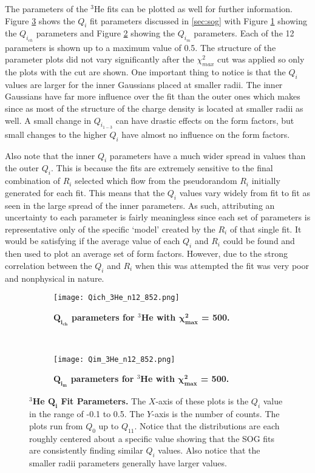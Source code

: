 The parameters of the $^3$He fits can be plotted as well for further information. Figure \ref{fig:3he_qi} shows the $Q_i$ fit parameters discussed in \ref{sec:sog} with Figure \ref{fig:3he_qch} showing the $Q_{i_{ch}}$ parameters and Figure \ref{fig:3he_qm} showing the $Q_{i_{m}}$ parameters. Each of the 12 parameters is shown up to a maximum value of 0.5. The structure of the parameter plots did not vary significantly after the $\chi^2_{max}$ cut was applied so only the plots with the cut are shown. One important thing to notice is that the $Q_i$ values are larger for the inner Gaussians placed at smaller radii. The inner Gaussians have far more influence over the fit than the outer ones which makes since as most of the structure of the charge density is located at smaller radii as well. A small change in $Q_{i_{1-3}}$ can have drastic effects on the form factors, but small changes to the higher $Q_i$ have almost no influence on the form factors. 

Also note that the inner $Q_i$ parameters have a much wider spread in values than the outer $Q_i$. This is because the fits are extremely sensitive to the final combination of $R_i$ selected which flow from the pseudorandom $R_i$ initially generated for each fit. This means that the $Q_i$ values vary widely from fit to fit as seen in the large spread of the inner parameters. As such, attributing an uncertainty to each parameter is fairly meaningless since each set of parameters is representative only of the specific `model' created by the $R_i$ of that single fit. It would be satisfying if the average value of each $Q_i$ and $R_i$ could be found and then used to plot an average set of form factors. However, due to the strong correlation between the $Q_i$ and $R_i$ when this was attempted the fit was very poor and nonphysical in nature.

\begin{figure}[!ht]
\begin{subfigure}{1.\textwidth}
  \centering
  \texttt{[image: Qich\_3He\_n12\_852.png]}
  \caption{\bf{$\boldsymbol{Q_{i_{ch}}}$ parameters for $^3$He with $\boldsymbol{\chi^2_{max}}$ = 500.}}
  \label{fig:3he_qch}
\end{subfigure}\\
\begin{subfigure}{1.\textwidth}
  \centering
  \texttt{[image: Qim\_3He\_n12\_852.png]}
  \caption{\bf{$\boldsymbol{Q_{i_{m}}}$ parameters for $^3$He with $\boldsymbol{\chi^2_{max}}$ = 500.}}
  \label{fig:3he_qm}
\end{subfigure}
\caption[$^3$He $Q_i$ Fit Parameters]{{\bf{$^3$He $\boldsymbol{Q_i}$ Fit Parameters.}} The $X$-axis of these plots is the $Q_i$ value in the range of -0.1 to 0.5. The $Y$-axis is the number of counts. The plots run from $Q_0$ up to $Q_{11}$. Notice that the distributions are each roughly centered about a specific value showing that the SOG fits are consistently finding similar $Q_i$ values. Also notice that the smaller radii parameters generally have larger values.}
\label{fig:3he_qi}
\end{figure}

